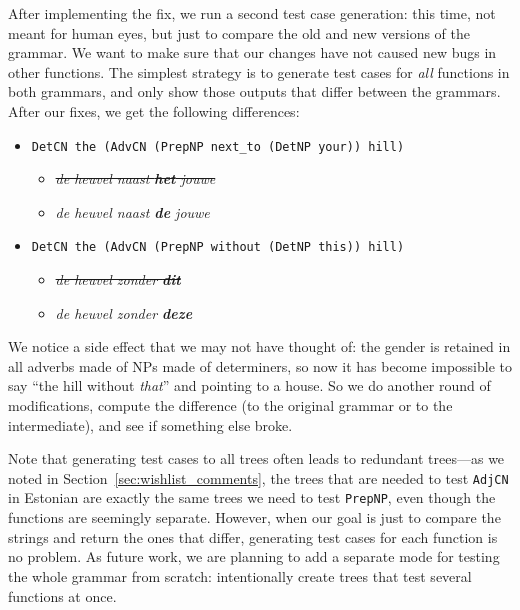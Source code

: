 \documentclass[11pt]{article}
\def\t#1{\texttt{#1}}
\begin{document}
After implementing the fix, we run a second test case generation: this
time, not meant for human eyes, but just to compare the old and new
versions of the grammar. We want to make sure that our changes 
have not caused new bugs in other functions. The simplest strategy is
to generate test cases for \emph{all} functions in both grammars, and
only show those outputs that differ between the grammars. After our
fixes, we get the following differences: 

\begin{itemize}
\item \t{DetCN the (AdvCN (PrepNP next\_to (DetNP your)) hill)}
  \begin{itemize}
   \item \emph{\sout{de heuvel naast {\bf  het} jouwe}}
   \item \emph{de heuvel naast {\bf  de} jouwe}
  \end{itemize}
\item \t{DetCN the (AdvCN (PrepNP without (DetNP this)) hill)}
  \begin{itemize}
   \item \emph{\sout{de heuvel zonder {\bf  dit}}}
   \item \emph{de heuvel zonder {\bf  deze}}
  \end{itemize}
\end{itemize}

\noindent We notice a side effect that we may not have thought of: the
gender is retained in all adverbs made of NPs made of determiners, so
now it has become impossible to say ``the hill without \emph{that}'' and
pointing to a house. So we do another round of modifications, compute
the difference (to the original grammar or to the intermediate), and
see if something else broke.

Note that generating test cases to all trees often leads to redundant
trees---as we noted in Section~\ref{sec:wishlist_comments}, the trees
that are needed to test \t{AdjCN} in Estonian are exactly the same
trees we need to test \t{PrepNP}, even though the functions are
seemingly separate. However, when our goal is just to compare the
strings and return the ones that differ, generating test cases for
each function is no problem. 
As future work, we are planning to add a separate mode for testing the
whole grammar from scratch: intentionally create trees that test
several functions at once.

\end{document}
